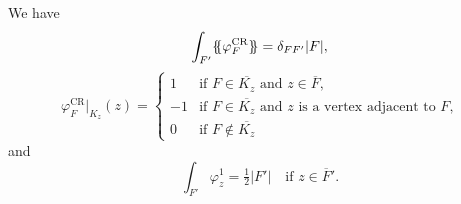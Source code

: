 \documentclass[review,onefignum,onetabnum,onealgnum]{siamart220329}
\begin{document}
We have
%
\begin{equation*}
  \int_{F'} \{\mskip-5mu\{ \varphi^{\mathrm{CR}}_F \}\mskip-5mu\} = \delta_{FF'} |F|,
\end{equation*}
%
\begin{equation*}
  \varphi^{\mathrm{CR}}_F|_{K_z}(z) = \begin{cases}
    1  & \text{if $F\in\overline{K_z}$ and $z\in\overline{F}$,} \\
    -1 & \text{if $F\in\overline{K_z}$ and $z$ is a~vertex adjacent to~$F$,} \\
    0  & \text{if $F\notin\overline{K_z}$}
  \end{cases}
\end{equation*}
%
and
%
\begin{equation*}
  \int_{F'} \varphi^1_z = \tfrac12 |F'| \quad \text{if $z\in\overline F'$.}
\end{equation*}
%




\begingroup
\raggedbottom
{}


\endgroup
\end{document}
